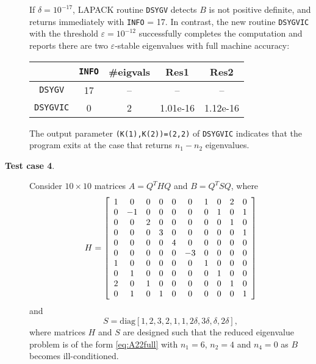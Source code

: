 \documentclass[11pt]{article}
\begin{document}
\begin{description}
If $\delta=10^{-17}$,
LAPACK routine {\tt DSYGV} detects $B$ is not positive definite, and 
returns immediately with {\tt INFO} = 17. 
In contrast, the new routine {\tt DSYGVIC} with the threshold 
$\varepsilon=10^{-12}$ successfully completes the computation and
reports there are two $\varepsilon$-stable eigenvalues with 
full machine accuracy: 
\begin{center}
  \begin{tabular}{ c || c | c | c | c   }
    		& {\tt INFO} & \#eigvals & Res1      & Res2    \\ \hline
    {\tt DSYGV}   & 17   &   --      &  --      &  --      \\
    {\tt DSYGVIC} &  0   &   2       & 1.01e-16 & 1.12e-16 \\ 
  \end{tabular}
\end{center}
The output parameter {\tt (K(1),K(2))=(2,2)} of {\tt DSYGVIC} indicates that 
the program exits at the case that returns $n_1-n_2$ eigenvalues.

\item[{\bf Test case 4}.] 
Consider $10 \times 10$ matrices $A=Q^THQ$ and $B = Q^TSQ$, where 
\[
H=\left[\begin{array}{c c c c c c c c c c}
1 & 0 & 0 & 0 & 0 & 0 & 1 & 0 & 2 & 0 \\
0 &-1 & 0 & 0 & 0 & 0 & 0 & 1 & 0 & 1 \\
0 & 0 & 2 & 0 & 0 & 0 & 0 & 0 & 1 & 0 \\
0 & 0 & 0 & 3 & 0 & 0 & 0 & 0 & 0 & 1 \\
0 & 0 & 0 & 0 & 4 & 0 & 0 & 0 & 0 & 0 \\
0 & 0 & 0 & 0 & 0 &-3 & 0 & 0 & 0 & 0 \\
1 & 0 & 0 & 0 & 0 & 0 & 1 & 0 & 0 & 0 \\
0 & 1 & 0 & 0 & 0 & 0 & 0 & 1 & 0 & 0 \\
2 & 0 & 1 & 0 & 0 & 0 & 0 & 0 & 1 & 0 \\
0 & 1 & 0 & 1 & 0 & 0 & 0 & 0 & 0 & 1
\end{array}\right]
\]
and 
\[
S=\mbox{diag}[1,2,3,2,1,1,2\delta,3\delta,\delta,2\delta],
\]
where matrices $H$ and $S$ are designed such that the 
reduced eigenvalue problem is of the form \eqref{eq:A22full}
with $n_1=6$, $n_2=4$ and $n_4=0$ as $B$ becomes ill-conditioned. 


\end{description}
\end{document}
